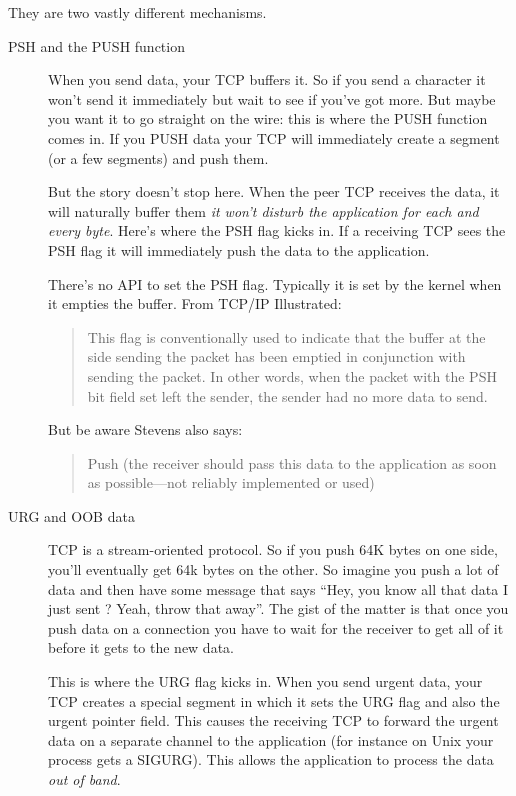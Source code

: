 They are two vastly different mechanisms.
\begin{description}
\item[PSH and the PUSH function] When you send data, your TCP buffers it. So if you send a
  character it won't send it immediately but wait to see if you've got more. But maybe you
  want it to go straight on the wire: this is where the PUSH function comes in. If you
  PUSH data your TCP will immediately create a segment (or a few segments) and push them.

  But the story doesn't stop here. When the peer TCP receives the data, it will naturally
  buffer them \emph{it won't disturb the application for each and every byte}. Here's
  where the PSH flag kicks in. If a receiving TCP sees the PSH flag it will immediately
  push the data to the application.

  There's no API to set the PSH flag. Typically it is set by the kernel when it empties
  the buffer. From TCP/IP Illustrated:

\begin{quote}
  This flag is conventionally used to indicate that the buffer at the side sending the
  packet has been emptied in conjunction with sending the packet. In other words, when the
  packet with the PSH bit field set left the sender, the sender had no more data to send.
\end{quote}

But be aware Stevens also says:

\begin{quote}
  Push (the receiver should pass this data to the application as soon as possible—not
  reliably implemented or used)
\end{quote}

\item[URG and OOB data] TCP is a stream-oriented protocol. So if you push 64K bytes on one
  side, you'll eventually get 64k bytes on the other. So imagine you push a lot of data
  and then have some message that says ``Hey, you know all that data I just sent ? Yeah,
  throw that away''. The gist of the matter is that once you push data on a connection you
  have to wait for the receiver to get all of it before it gets to the new data.

  This is where the URG flag kicks in. When you send urgent data, your TCP creates a
  special segment in which it sets the URG flag and also the urgent pointer field. This
  causes the receiving TCP to forward the urgent data on a separate channel to the
  application (for instance on Unix your process gets a SIGURG). This allows the
  application to process the data \emph{out of band}.


\end{description}
